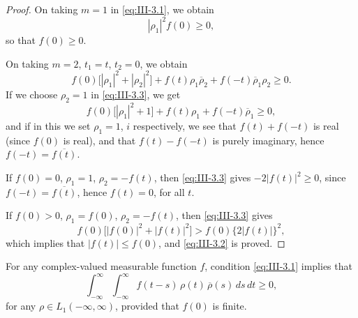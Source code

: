 \begin{proof}
On taking $m=1$ in \eqref{eq:III-3.1}, we obtain
\[
|\rho_{1}|^{2}f(0)\ge0,
\]
so that $f(0)\ge0$.

On taking $m=2$, $t_{1}=t$, $t_{2}=0$, we obtain
\begin{equation}\tag{3.3}\label{eq:III-3.3}
f(0)\bigl[|\rho_{1}|^{2}+|\rho_{2}|^{2}\bigr]+f(t)\rho_{1}\overline{\rho}_{2}+f(-t)\overline{\rho}_{1}\rho_{2}\ge0.
\end{equation}
If we choose $\rho_{2}=1$ in \eqref{eq:III-3.3}, we get
\[
f(0)\bigl[|\rho_{1}|^{2}+1\bigr]+f(t)\rho_{1}+f(-t)\overline{\rho}_{1}\ge0,
\]
and if in this we set $\rho_{1}=1$, $i$ respectively, we see that $f(t)+f(-t)$ is real (since $f(0)$ is real), and that $f(t)-f(-t)$ is purely imaginary, hence $f(-t)=\overline{f(t)}$.

If $f(0)=0$, $\rho_{1}=1$, $\rho_{2}=-f(t)$, then \eqref{eq:III-3.3} gives $-2|f(t)|^{2}\ge0$, since $f(-t)=\overline{f(t)}$, hence $f(t)=0$, for all $t$.

If $f(0)>0$, $\rho_{1}=f(0)$, $\rho_{2}=-f(t)$, then \eqref{eq:III-3.3} gives
\[
f(0)\bigl[|f(0)|^{2}+|f(t)|^{2}\bigr]>f(0)\bigl\{2|f(t)|\bigr\}^{2},
\]
which implies that $|f(t)|\le f(0)$, and \eqref{eq:III-3.2} is proved.
\end{proof}

\begin{lemma}[F. Riesz]\label{lem:III-2}
For any complex-valued measurable function $f$, condition \eqref{eq:III-3.1} implies that
\begin{equation}\tag{3.4}\label{eq:III-3.4}
\int_{-\infty}^{\infty}\int_{-\infty}^{\infty}f(t-s)\,\rho(t)\,\overline{\rho}(s)\,ds\,dt\ge0,
\end{equation}
for any $\rho\in L_{1}(-\infty,\infty)$, provided that $f(0)$ is finite.
\end{lemma}

